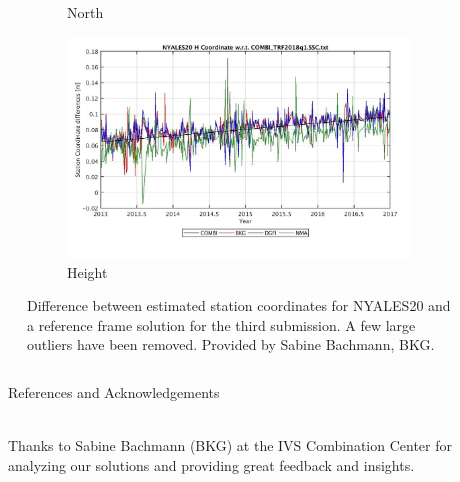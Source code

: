 \documentclass{beamer}
\begin{document}
\begin{frame}[t]
\begin{columns}
\begin{column}[t]{\textwidth}
\begin{figure}
\begin{subfigure}{0.33\textwidth}
        \caption{North}
        \label{fig:nyal_n}
      \end{subfigure}
      \begin{subfigure}{0.33\textwidth}
        \includegraphics[width=\linewidth]{figure/NYALES20-H_diff-trf}
        \caption{Height}
        \label{fig:nyal_h}
      \end{subfigure}
      \caption{Difference between estimated station coordinates for NYALES20 and a reference frame solution for the
        third submission.  A few large outliers have been removed. Provided by Sabine Bachmann, BKG.}
      \label{fig:nyal}
      \end{figure}
    \end{column}
  \end{columns}

  \vspace*{1cm}
  \begin{columns}
    \begin{column}[t]{.15\textwidth}
    \end{column}

    \begin{column}[t]{.82\textwidth}
      \begin{block}{References and Acknowledgements}
        \vspace*{-1cm}                   %
        \begin{minipage}{.98\textwidth}  %
          \begin{multicols}{4}
            

            \vspace*{3ex}{\bfseries Acknowledgements}\\

            Thanks to Sabine Bachmann (BKG) at the IVS Combination Center for analyzing our solutions and providing great feedback and insights.
          \end{multicols}
        \end{minipage}
      \end{block}
    \end{column}
  \end{columns}
\end{frame}
\end{document}
